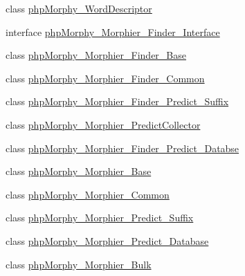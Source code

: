 \begin{DoxyCompactItemize}
\item 
class \hyperlink{classphpMorphy__WordDescriptor}{phpMorphy\_\-WordDescriptor}
\item 
interface \hyperlink{interfacephpMorphy__Morphier__Finder__Interface}{phpMorphy\_\-Morphier\_\-Finder\_\-Interface}
\item 
class \hyperlink{classphpMorphy__Morphier__Finder__Base}{phpMorphy\_\-Morphier\_\-Finder\_\-Base}
\item 
class \hyperlink{classphpMorphy__Morphier__Finder__Common}{phpMorphy\_\-Morphier\_\-Finder\_\-Common}
\item 
class \hyperlink{classphpMorphy__Morphier__Finder__Predict__Suffix}{phpMorphy\_\-Morphier\_\-Finder\_\-Predict\_\-Suffix}
\item 
class \hyperlink{classphpMorphy__Morphier__PredictCollector}{phpMorphy\_\-Morphier\_\-PredictCollector}
\item 
class \hyperlink{classphpMorphy__Morphier__Finder__Predict__Databse}{phpMorphy\_\-Morphier\_\-Finder\_\-Predict\_\-Databse}
\item 
class \hyperlink{classphpMorphy__Morphier__Base}{phpMorphy\_\-Morphier\_\-Base}
\item 
class \hyperlink{classphpMorphy__Morphier__Common}{phpMorphy\_\-Morphier\_\-Common}
\item 
class \hyperlink{classphpMorphy__Morphier__Predict__Suffix}{phpMorphy\_\-Morphier\_\-Predict\_\-Suffix}
\item 
class \hyperlink{classphpMorphy__Morphier__Predict__Database}{phpMorphy\_\-Morphier\_\-Predict\_\-Database}
\item 
class \hyperlink{classphpMorphy__Morphier__Bulk}{phpMorphy\_\-Morphier\_\-Bulk}
\end{DoxyCompactItemize}

